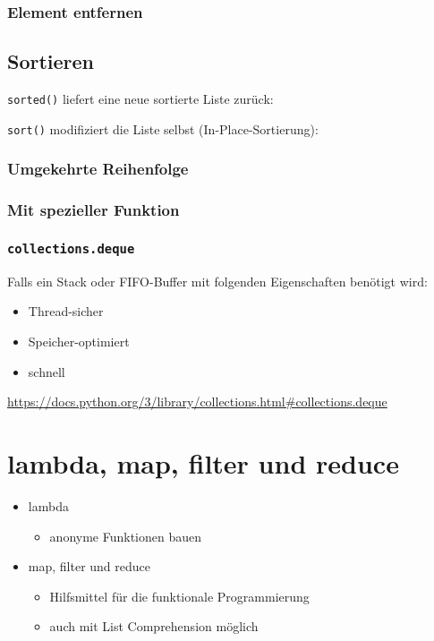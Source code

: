 \subsubsection{Element entfernen}


\subsection{Sortieren}
\texttt{sorted()} liefert eine neue sortierte Liste zurück:

\texttt{sort()} modifiziert die Liste selbst (In-Place-Sortierung):


\subsubsection{Umgekehrte Reihenfolge}


\subsubsection{Mit spezieller Funktion}


\subsubsection{\texttt{collections.deque}}
Falls ein Stack oder FIFO-Buffer mit folgenden Eigenschaften benötigt wird:
\begin{itemize}
	\item Thread-sicher
	\item Speicher-optimiert
	\item schnell
\end{itemize}
\url{https://docs.python.org/3/library/collections.html#collections.deque}


\section{lambda, map, filter und reduce}
\begin{itemize}
	\item lambda
	\begin{itemize}
		\item anonyme Funktionen bauen
	\end{itemize}
	\item map, filter und reduce
	\begin{itemize}
		\item Hilfsmittel für die funktionale Programmierung
		\item auch mit List Comprehension möglich
	\end{itemize}
\end{itemize}

